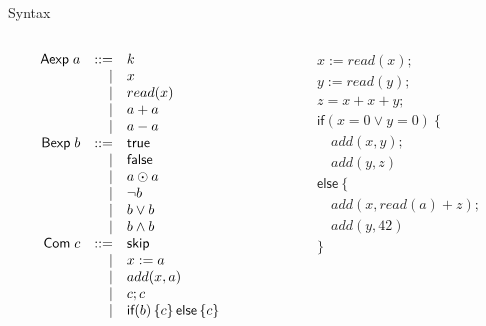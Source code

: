 \documentclass[xcolor={dvipsnames,svgnames,table}]{beamer}
\begin{document}
\begin{frame}{\imp{} Syntax}
  \begin{columns}
    \begin{column}{0.6\textwidth}
      \footnotesize
      \[
        \begin{array}{rrl}
          \textsf{Aexp}\;
            a & ::= & k       \\
              & |   & x       \\
              & |   & read(x) \\
              & |   & a + a   \\
              & |   & a - a   \\
          \textsf{Bexp}\;
            b & ::= & \textsf{true}  \\
              & |   & \textsf{false} \\
              & |   & a \odot a      \\
              & |   & \lnot b        \\
              & |   & b \lor b       \\
              & |   & b \land b      \\
          \textsf{Com}\;
            c  & ::= & \textsf{skip}        \\
               & |   & x := a          \\
               & |   & add(x, a)       \\
               & |   & c; c            \\
               & |   & \textsf{if}(b)\left\{c\right\}\textsf{else}\left\{c\right\} \\
        \end{array}
      \]
    \end{column}
    \begin{column}{0.4\textwidth}
      \begin{align*}
        & x := read(x); \\
        & y := read(y); \\
        & z = x + x + y; \\
        & \textsf{if}(x = 0 \lor y = 0)\ \{ \\
        & \quad add(x, y); \\
        & \quad add(y, z) \\
        & \textsf{else}\ \{ \\
        & \quad add(x, read(a) + z); \\
        & \quad add(y, 42) \\
        & \}
      \end{align*}
    \end{column}
  \end{columns}
\end{frame}
\end{document}
